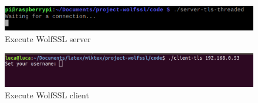\documentclass[a4paper,12pt]{report}
\begin{document}
\begin{figure}[H]
    \centering
    \includegraphics[scale=0.65]{./code/img/1-server.png}
    \caption{Execute WolfSSL server}
    \label{fig:galaxy}
\end{figure}

\begin{figure}[H]
    \centering
    \includegraphics[scale=0.248]{./code/img/1-client.png}
    \caption{Execute WolfSSL client}
    \label{fig:galaxy}
\end{figure}
\end{document}
